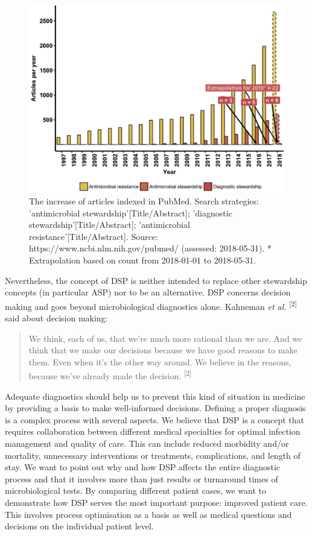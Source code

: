 \documentclass[
]{book}
\begin{document}
\begin{figure}

{\centering \includegraphics[width=0.8\linewidth]{images/02-01} 

}

\caption{The increase of articles indexed in PubMed. Search strategies: 'antimicrobial stewardship'[Title/Abstract]; 'diagnostic stewardship'[Title/Abstract]; 'antimicrobial resistance'[Title/Abstract]. Source: https://www.ncbi.nlm.nih.gov/pubmed/ (assessed: 2018-05-31). * Extrapolation based on count from 2018-01-01 to 2018-05-31.}\label{fig:fig2-1}
\end{figure}

Nevertheless, the concept of DSP is neither intended to replace other stewardship concepts (in particular ASP) nor to be an alternative. DSP concerns decision making and goes beyond microbiological diagnostics alone. Kahneman \emph{et al.} \textsuperscript{{[}2{]}} said about decision making:

\begin{quote}
We think, each of us, that we're much more rational than we are. And we think that we make our decisions because we have good reasons to make them. Even when it's the other way around. We believe in the reasons, because we've already made the decision. \textsuperscript{{[}2{]}}
\end{quote}

Adequate diagnostics should help us to prevent this kind of situation in medicine by providing a basis to make well-informed decisions. Defining a proper diagnosis is a complex process with several aspects. We believe that DSP is a concept that requires collaboration between different medical specialties for optimal infection management and quality of care. This can include reduced morbidity and/or mortality, unnecessary interventions or treatments, complications, and length of stay. We want to point out why and how DSP affects the entire diagnostic process and that it involves more than just results or turnaround times of microbiological tests. By comparing different patient cases, we want to demonstrate how DSP serves the most important purpose: improved patient care. This involves process optimisation as a basis as well as medical questions and decisions on the individual patient level.
\end{document}
